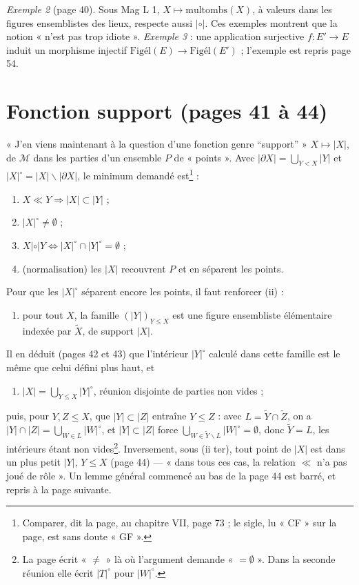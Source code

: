 \documentclass[11pt,a4paper]{article}
\begin{document}
\emph{Exemple 2} (page 40). Sous Mag L 1, $X \mapsto \mathrm{multombs}(X)$, à
valeurs dans les figures ensemblistes des lieux, respecte aussi
$\mathrel{|\circ|}$. Ces exemples montrent que la notion « n'est pas trop
idiote ». \emph{Exemple 3} : une application surjective $f : E' \to E$ induit
un morphisme injectif $\mathrm{Figél}(E) \to \mathrm{Figél}(E')$ ; l'exemple
est repris page 54.

\section*{Fonction support (pages 41 à 44)}

« J'en viens maintenant à la question d'une fonction genre “support” »
$X \mapsto |X|$, de $\mathcal{M}$ dans les parties d'un ensemble $P$ de
« points ». Avec $|\partial X| = \bigcup_{Y < X} |Y|$ et $|X|^{\circ} = |X|
\smallsetminus |\partial X|$, le minimum demandé est\footnote{Comparer, dit la
page, au chapitre VII, page 73 ; le sigle, lu « CF » sur la page, est sans doute
« GF ».} :
\begin{enumerate}
\item[(i)] $X \ll Y \Rightarrow |X| \subset |Y|$ ;
\item[(ii)] $|X|^{\circ} \neq \emptyset$ ;
\item[(iii)] $X \mathrel{|\circ|} Y \iff |X|^{\circ} \cap |Y|^{\circ} =
\emptyset$ ;
\item[(iv)] (normalisation) les $|X|$ recouvrent $P$ et en séparent les
points.
\end{enumerate}
Pour que les $|X|^{\circ}$ séparent encore les points, il faut renforcer (ii) :
\begin{enumerate}
\item[(ii bis)] pour tout $X$, la famille $(|Y|)_{Y \leq X}$ est une figure
ensembliste élémentaire indexée par $\widetilde{X}$, de support $|X|$.
\end{enumerate}
Il en déduit (pages 42 et 43) que l'intérieur $|Y|^{\circ}$ calculé dans cette
famille est le même que celui défini plus haut, et
\begin{enumerate}
\item[(ii ter)] $|X| = \bigcup_{Y \leq X} |Y|^{\circ}$, réunion disjointe de
parties non vides ;
\end{enumerate}
puis, pour $Y, Z \leq X$, que $|Y| \subset |Z|$ entraîne $Y \leq Z$ : avec $L =
\widetilde{Y} \cap \widetilde{Z}$, on a $|Y| \cap |Z| = \bigcup_{W \in L}
|W|^{\circ}$, et $|Y| \subset |Z|$ force $\bigcup_{W \in \widetilde{Y}
\smallsetminus L} |W|^{\circ} = \emptyset$, donc $\widetilde{Y} = L$, les
intérieurs étant non vides\footnote{La page écrit « $\neq$ » là où l'argument
demande « $= \emptyset$ ». Dans la seconde réunion elle écrit $|T|^{\circ}$ pour
$|W|^{\circ}$.}. Inversement, sous (ii ter), tout point de $|X|$ est dans un
plus petit $|Y|$, $Y \leq X$ (page 44) --- « dans tous ces cas, la relation
$\ll$ n'a pas joué de rôle ». Un lemme général commencé au bas de la page 44
est barré, et repris à la page suivante.
\end{document}
